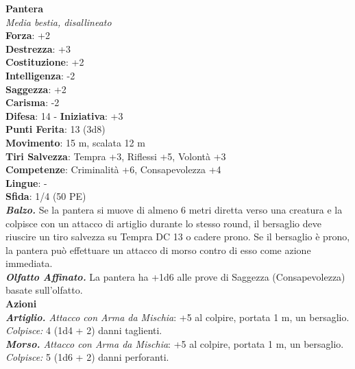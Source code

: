 \begin{multicols}{2}
\medskip\textbf{Pantera}\\
\emph{Media bestia, disallineato}\\
\textbf{Forza}: +2\\
\textbf{Destrezza}: +3\\
\textbf{Costituzione}: +2\\
\textbf{Intelligenza}: -2\\
\textbf{Saggezza}: +2\\
\textbf{Carisma}: -2\\
\textbf{Difesa}: 14 - \textbf{Iniziativa}: +3\\
\textbf{Punti Ferita}: 13 (3d8)\\
\textbf{Movimento}: 15 m, scalata 12 m\\
\textbf{Tiri Salvezza}: Tempra +3, Riflessi +5, Volontà +3 \\
\textbf{Competenze}: Criminalità +6, Consapevolezza +4\\
\textbf{Lingue}: -\\
\textbf{Sfida}: 1/4 (50 PE)\smallskip\\
\emph{\textbf{Balzo.}} Se la pantera si muove di almeno 6 metri diretta verso una creatura e la colpisce con un attacco di artiglio durante lo stesso round, il bersaglio deve riuscire un tiro salvezza su Tempra DC  13 o cadere prono. Se il bersaglio è prono, la pantera può effettuare un attacco di morso contro di esso come azione immediata.\\
\emph{\textbf{Olfatto Affinato.}} La pantera ha +1d6 alle prove di Saggezza (Consapevolezza) basate sull'olfatto.\\
\smallskip\textbf{Azioni}\\
\emph{\textbf{Artiglio.} Attacco con Arma da Mischia}: +5 al colpire, portata 1 m, un bersaglio.\\
\emph{Colpisce:} 4 (1d4 + 2) danni taglienti.\\
\emph{\textbf{Morso.} Attacco con Arma da Mischia}: +5 al colpire, portata 1 m, un bersaglio.\\
\emph{Colpisce:} 5 (1d6 + 2) danni perforanti.\\


\end{multicols}
